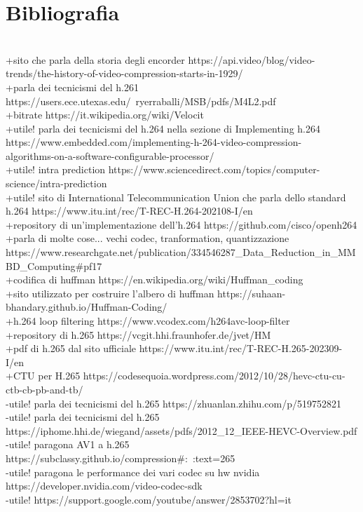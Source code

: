 \documentclass[a4paper,12pt, oneside]{article}
\begin{document}
\section{Bibliografia}
\\+sito che parla della storia degli encorder https://api.video/blog/video-trends/the-history-of-video-compression-starts-in-1929/
\\+parla dei tecnicismi del h.261 https://users.ece.utexas.edu/~ryerraballi/MSB/pdfs/M4L2.pdf
\\+bitrate https://it.wikipedia.org/wiki/Velocit%
\\+utile! parla dei tecnicismi del h.264 nella sezione di Implementing h.264 https://www.embedded.com/implementing-h-264-video-compression-\\algorithms-on-a-software-configurable-processor/
\\+utile! intra prediction https://www.sciencedirect.com/topics/computer-science/intra-prediction
\\+utile! sito di International Telecommunication Union che parla dello standard h.264 https://www.itu.int/rec/T-REC-H.264-202108-I/en
\\+repository di un'implementazione dell'h.264 https://github.com/cisco/openh264
\\+parla di molte cose... vechi codec, tranformation, quantizzazione https://www.researchgate.net/publication/334546287_Data_Reduction_in_MMBD_Computing#pf17
\\+codifica di huffman https://en.wikipedia.org/wiki/Huffman_coding
\\+sito utilizzato per costruire l'albero di huffman https://suhaan-bhandary.github.io/Huffman-Coding/
\\+h.264 loop filtering https://www.vcodex.com/h264avc-loop-filter
\\+repository di h.265 https://vcgit.hhi.fraunhofer.de/jvet/HM
\\+pdf di h.265 dal sito ufficiale https://www.itu.int/rec/T-REC-H.265-202309-I/en
\\+CTU per H.265 https://codesequoia.wordpress.com/2012/10/28/hevc-ctu-cu-ctb-cb-pb-and-tb/
\\-utile! parla dei tecnicismi del h.265 https://zhuanlan.zhihu.com/p/519752821
\\-utile! parla dei tecnicismi del h.265 https://iphome.hhi.de/wiegand/assets/pdfs/2012_12_IEEE-HEVC-Overview.pdf
\\-utile! paragona AV1 a h.265 https://subclassy.github.io/compression#:~:text=265%
\\-utile! paragona le performance dei vari codec su hw nvidia https://developer.nvidia.com/video-codec-sdk
\\-utile! https://support.google.com/youtube/answer/2853702?hl=it
\end{document}
